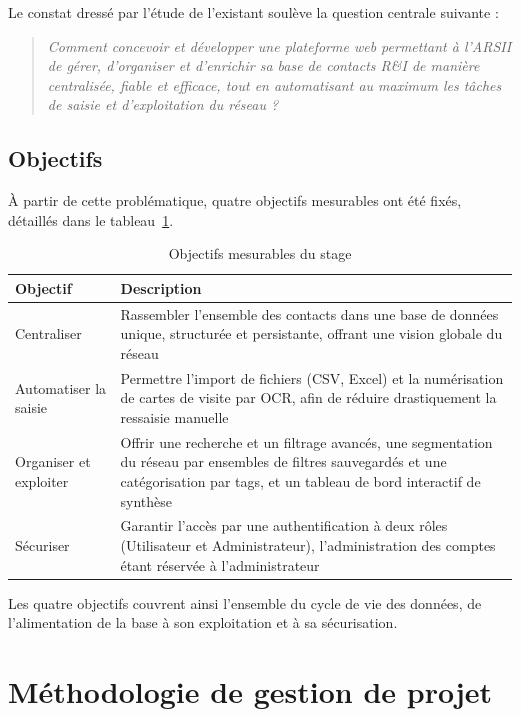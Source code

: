 Le constat dressé par l'étude de l'existant soulève la question centrale suivante :

\begin{quotation}
\textit{Comment concevoir et développer une plateforme web permettant à l'ARSII de gérer, d'organiser et d'enrichir sa base de contacts R\&I de manière centralisée, fiable et efficace, tout en automatisant au maximum les tâches de saisie et d'exploitation du réseau ?}
\end{quotation}

\subsection{Objectifs}

À partir de cette problématique, quatre objectifs mesurables ont été fixés, détaillés dans le tableau~\ref{tab:objectifs}.

\begin{table}[H]
\centering
\small
\begin{tabularx}{\textwidth}{|l|X|}
\hline
\textbf{Objectif} & \textbf{Description} \\
\hline
Centraliser & Rassembler l'ensemble des contacts dans une base de données unique, structurée et persistante, offrant une vision globale du réseau \\
\hline
Automatiser la saisie & Permettre l'import de fichiers (CSV, Excel) et la numérisation de cartes de visite par \ac{OCR}, afin de réduire drastiquement la ressaisie manuelle \\
\hline
Organiser et exploiter & Offrir une recherche et un filtrage avancés, une segmentation du réseau par ensembles de filtres sauvegardés et une catégorisation par tags, et un tableau de bord interactif de synthèse \\
\hline
Sécuriser & Garantir l'accès par une authentification à deux rôles (Utilisateur et Administrateur), l'administration des comptes étant réservée à l'administrateur \\
\hline
\end{tabularx}
\caption{Objectifs mesurables du stage}
\label{tab:objectifs}
\end{table}

Les quatre objectifs couvrent ainsi l'ensemble du cycle de vie des données, de l'alimentation de la base à son exploitation et à sa sécurisation.

\section{Méthodologie de gestion de projet}

